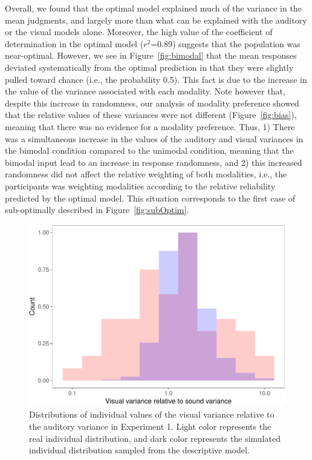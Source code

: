 \documentclass[english,floatsintext,man]{apa6}
\theoremstyle{definition}
\theoremstyle{definition}
\theoremstyle{definition}
\theoremstyle{remark}
\begin{document}
Overall, we found that the optimal model explained much of the variance
in the mean judgments, and largely more than what can be explained with
the auditory or the visual models alone. Moreover, the high value of the
coefficient of determination in the optimal model (\(r^2\)=0.89)
suggests that the population was near-optimal. However, we see in
Figure~\ref{fig:bimodal} that the mean responses deviated systematically
from the optimal prediction in that they were slightly pulled toward
chance (i.e., the probability 0.5). This fact is due to the increase in
the value of the variance associated with each modality. Note however
that, despite this increase in randomness, our analysis of modality
preference showed that the relative values of these variances were not
different (Figure~\ref{fig:bias}), meaning that there was no evidence
for a modality preference. Thus, 1) There was a simultaneous increase in
the values of the auditory and visual variances in the bimodal condition
compared to the unimodal condition, meaning that the bimodal input lead
to an increase in response randomness, and 2) this increased randomness
did not affect the relative weighting of both modalities, i.e., the
participants was weighting modalities according to the relative
reliability predicted by the optimal model. This situation corresponds
to the first case of sub-optimally described in
Figure~\ref{fig:subOptim}.

\begin{figure}[!h]
\includegraphics[width=\textwidth]{ms_files/figure-latex/individual-1} \caption{Distributions of individual values of the visual variance relative to the auditory variance in Experiment 1. Light color represents the real individual distribution, and dark color represents the simulated individual distribution sampled from the descriptive model.}\label{fig:individual}
\end{figure}
\end{document}
